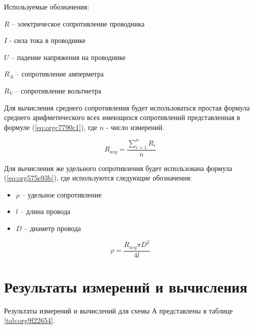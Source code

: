 \documentclass[14pt]{extarticle}
\begin{document}
Используемые обозначения:

\(R\) -- электрическое сопротивление проводника

\(I\) - сила тока в проводнике

\(U\) -- падение напряжения на проводнике

\(R_A\) -- сопротивление амперметра 

\(R_V\) -- сопротивление вольтметра

Для вычисления среднего сопротивления будет использоваться простая
формула среднего арифметического всех имеющихся сопротивлений
представленная в формуле (\ref{eq:orgc7790c1}), где \(n\) - число измерений.


\begin{equation}
\label{eq:orgc7790c1}
R_{avg} = \frac{\sum\limits_{i = 1}^{n} R_i}{n}
\end{equation}

Для вычисления же удельного сопротивления будет использована формула (\ref{eq:org575e93b}),
где используются следующие обозначения:

\begin{itemize}
\item \(\rho\) -- удельное сопротивление
\item \(l\) -- длина провода
\item \(D\) -- диаметр провода
\end{itemize}

\begin{equation}
\label{eq:org575e93b}
\rho = \frac{R_{avg} \pi D^2}{4l}
\end{equation}

\section{Результаты измерений и вычисления}
\label{sec:orga250695}

Результаты измерений и вычислений для схемы А представлены в таблице \ref{tab:org9f22654}.
\end{document}
